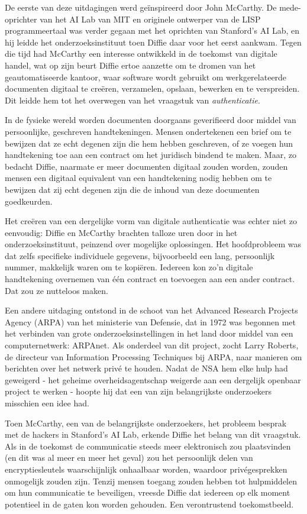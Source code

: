 \documentclass[smalldemyvopaper,11pt,twoside,onecolumn,openright,extrafontsizes,hidelinks]{memoir}
\begin{document}
De eerste van deze uitdagingen werd geïnspireerd door John McCarthy. De
mede-oprichter van het AI Lab van MIT en originele ontwerper van de LISP
programmeertaal was verder gegaan met het oprichten van Stanford's AI
Lab, en hij leidde het onderzoeksinstituut toen Diffie daar voor het
eerst aankwam. Tegen die tijd had McCarthy een interesse ontwikkeld in
de toekomst van digitale handel, wat op zijn beurt Diffie ertoe aanzette
om te dromen van het geautomatiseerde kantoor, waar software wordt
gebruikt om werkgerelateerde documenten digitaal te creëren, verzamelen,
opslaan, bewerken en te verspreiden. Dit leidde hem tot het overwegen
van het vraagstuk van \emph{authenticatie}.

In de fysieke wereld worden documenten doorgaans geverifieerd door
middel van persoonlijke, geschreven handtekeningen. Mensen ondertekenen
een brief om te bewijzen dat ze echt degenen zijn die hem hebben
geschreven, of ze voegen hun handtekening toe aan een contract om het
juridisch bindend te maken. Maar, zo bedacht Diffie, naarmate er meer
documenten digitaal zouden worden, zouden mensen een digitaal equivalent
van een handtekening nodig hebben om te bewijzen dat zij echt degenen
zijn die de inhoud van deze documenten goedkeurden.

Het creëren van een dergelijke vorm van digitale authenticatie was
echter niet zo eenvoudig: Diffie en McCarthy brachten talloze uren door
in het onderzoeksinstituut, peinzend over mogelijke oplossingen. Het
hoofdprobleem was dat zelfs specifieke individuele gegevens,
bijvoorbeeld een lang, persoonlijk nummer, makkelijk waren om te
kopiëren. Iedereen kon zo'n digitale handtekening overnemen van één
contract en toevoegen aan een ander contract. Dat zou ze nutteloos
maken.

Een andere uitdaging ontstond in de schoot van het Advanced Research
Projects Agency (ARPA) van het ministerie van Defensie, dat in 1972 was
begonnen met het verbinden van grote onderzoeksinstellingen in het land
door middel van een computernetwerk: ARPAnet. Als onderdeel van dit
project, zocht Larry Roberts, de directeur van Information Processing
Techniques bij ARPA, naar manieren om berichten over het netwerk privé
te houden. Nadat de NSA hem elke hulp had geweigerd - het geheime
overheidsagentschap weigerde aan een dergelijk openbaar project te
werken - hoopte hij dat een van zijn belangrijkste onderzoekers
misschien een idee had.

Toen McCarthy, een van de belangrijkste onderzoekers, het probleem
besprak met de hackers in Stanford's AI Lab, erkende Diffie het belang
van dit vraagstuk. Als in de toekomst de communicatie steeds meer
elektronisch zou plaatsvinden (en dit was al meer en meer het geval) zou
het persoonlijk delen van encryptiesleutels waarschijnlijk onhaalbaar
worden, waardoor privégesprekken onmogelijk zouden zijn. Tenzij mensen
toegang zouden hebben tot hulpmiddelen om hun communicatie te
beveiligen, vreesde Diffie dat iedereen op elk moment potentieel in de
gaten kon worden gehouden. Een verontrustend toekomstbeeld.
\end{document}
